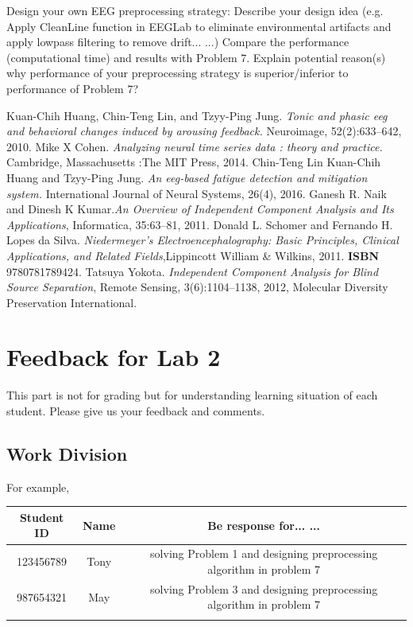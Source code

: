 \documentclass[a4 paper]{article}
\begin{document}
\begin{tcolorbox}[colback=RubineRed!5!white,colframe=RubineRed!75!black]
Design your own EEG preprocessing strategy:
 Describe your design idea (e.g. Apply CleanLine function in EEGLab to eliminate environmental artifacts and apply lowpass filtering to remove drift... ...)
 Compare the performance (computational time) and results with Problem 7.
 Explain potential reason(s) why performance of your preprocessing strategy is superior/inferior to performance of Problem 7? 
\end{tcolorbox}
\begin{thebibliography}{6}
Kuan-Chih Huang, Chin-Teng Lin, and Tzyy-Ping Jung. \textit{Tonic and phasic eeg and behavioral changes induced by arousing feedback.} Neuroimage, 52(2):633–642, 2010.
Mike X Cohen. \textit{Analyzing neural time series data : theory and practice.} Cambridge, Massachusetts :The MIT Press, 2014.
\bibitem{}
Chin-Teng Lin Kuan-Chih Huang and Tzyy-Ping Jung. \textit{An eeg-based fatigue detection and mitigation system.} International Journal of Neural Systems, 26(4), 2016.
Ganesh R. Naik and Dinesh K Kumar.\textit{An Overview of Independent Component Analysis and Its Applications}, Informatica, 35:63--81, 2011.
Donald L. Schomer and Fernando H. Lopes da Silva.
\textit{Niedermeyer's Electroencephalography: Basic Principles, Clinical Applications, and Related Fields},Lippincott William \& Wilkins, 2011. \textbf{ISBN} 9780781789424.
Tatsuya Yokota. \textit{Independent Component Analysis for Blind Source Separation}, Remote Sensing, 3(6):1104--1138, 2012, Molecular Diversity Preservation International.
\end{thebibliography}
\newpage
\section{Feedback for Lab 2}
This part is not for grading but for understanding learning situation of each student. Please give us your feedback and comments.
\subsection{Work Division}
For example,\\
\begin{center}
    \begin{tabular}{||c|c|c||}
    \hline
     Student ID & Name & Be response for... ... \\
    \hline
     123456789 & Tony & solving Problem 1 and designing preprocessing algorithm in problem 7\\
     \hline
     987654321 & May & solving Problem 3 and designing preprocessing algorithm in problem 7\\
     \hline
      & & \\
     \hline
\end{tabular}
\end{center}
\end{document}
